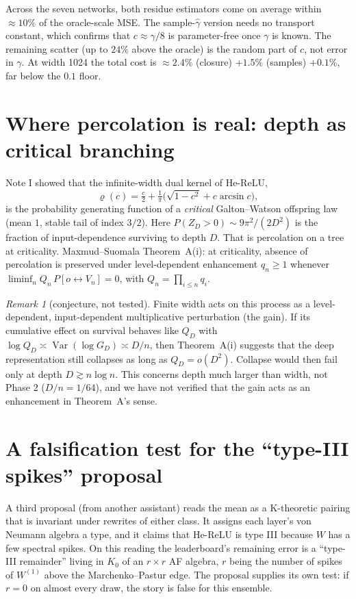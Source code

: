 \documentclass[11pt]{article}
\theoremstyle{definition}
\theoremstyle{remark}
\newtheorem{remark}[theorem]{Remark}
\newcommand{\Var}{\operatorname{Var}}
\begin{document}
\noindent Across the seven networks, both residue estimators come on average within $\approx10\%$ of the oracle-scale MSE. The sample-$\hat\gamma$ version needs no transport constant, which confirms that $c\approx\gamma/8$ is parameter-free once $\gamma$ is known. The remaining scatter (up to $24\%$ above the oracle) is the random part of $c$, not error in $\gamma$. At width 1024 the total cost is $\approx2.4\%$ (closure) $+1.5\%$ (samples) $+0.1\%$, far below the $0.1$ floor.

\section{Where percolation is real: depth as critical branching}\label{sec:branching}

Note I showed that the infinite-width dual kernel of He-ReLU,
\[
\varrho(c)=\tfrac c2+\tfrac1\pi\big(\sqrt{1-c^2}+c\arcsin c\big),
\]
is the probability generating function of a \emph{critical} Galton--Watson offspring law (mean $1$, stable tail of index $3/2$). Here $P(Z_D>0)\sim9\pi^2/(2D^2)$ is the fraction of input-dependence surviving to depth $D$. That is percolation on a tree at criticality. Maxmud--Suomala Theorem~A(i): at criticality, absence of percolation is preserved under level-dependent enhancement $q_n\ge1$ whenever $\liminf_nQ_n\,P[o\leftrightarrow V_n]=0$, with $Q_n=\prod_{i\le n}q_i$.

\begin{remark}[conjecture, not tested]\label{rem:conj}
Finite width acts on this process as a level-dependent, input-dependent multiplicative perturbation (the gain). If its cumulative effect on survival behaves like $Q_D$ with $\log Q_D\asymp\Var(\log G_D)\asymp D/n$, then Theorem~A(i) suggests that the deep representation still collapses as long as $Q_D=o(D^2)$. Collapse would then fail only at depth $D\gtrsim n\log n$. This concerns depth much larger than width, not Phase 2 ($D/n=1/64$), and we have not verified that the gain acts as an enhancement in Theorem~A's sense.
\end{remark}

\section{A falsification test for the ``type-III spikes'' proposal}\label{sec:spikes}

A third proposal (from another assistant) reads the mean as a K-theoretic pairing that is invariant under rewrites of either class. It assigns each layer's von Neumann algebra a type, and it claims that He-ReLU is type III because $W$ has a few spectral spikes. On this reading the leaderboard's remaining error is a ``type-III remainder'' living in $K_0$ of an $r\times r$ AF algebra, $r$ being the number of spikes of $W^{(1)}$ above the Marchenko--Pastur edge. The proposal supplies its own test: if $r=0$ on almost every draw, the story is false for this ensemble.
\end{document}
